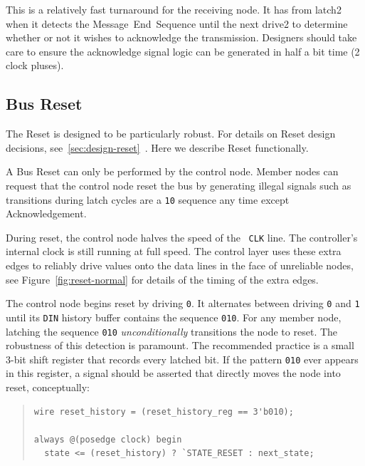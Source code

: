 This is a relatively fast turnaround for the receiving node. It has from {\sc
latch2} when it detects the Message~End~Sequence until the next {\sc drive2} to
determine whether or not it wishes to acknowledge the transmission. Designers
should take care to ensure the acknowledge signal logic can be generated in
half a bit time (2 clock pluses).


\subsection{Bus Reset}
\label{sec:protocol-reset}
The \bus Reset is designed to be particularly robust. For details on Reset
design decisions, see~\ref{sec:design-reset}~. Here
we describe Reset functionally.

A Bus Reset can only be performed by the control node. Member nodes can
request that the control node reset the bus by generating illegal signals such
as transitions during {\sc latch} cycles are a {\tt 10} sequence any time
except Acknowledgement.

During reset, the control node halves the speed of the \bus~{\tt CLK} line.
The controller's internal clock is still running at full speed. The control
layer uses these extra edges to reliably drive values onto the data lines in
the face of unreliable nodes, see Figure~\ref{fig:reset-normal} for details of
the timing of the extra edges.

The control node begins reset by driving {\tt 0}. It alternates between
driving {\tt 0} and {\tt 1} until its {\tt DIN} history buffer contains the
sequence {\tt 010}. For any member node, latching the sequence {\tt 010} {\em
unconditionally} transitions the node to {\sc reset}. The robustness of this
detection is paramount. The recommended practice is a small 3-bit shift
register that records every latched bit. If the pattern {\tt 010} ever appears
in this register, a signal should be asserted that directly moves the node
into {\sc reset}, conceptually:

\begin{quote}
\begin{lstlisting}
wire reset_history = (reset_history_reg == 3'b010);

always @(posedge clock) begin
  state <= (reset_history) ? `STATE_RESET : next_state;
\end{lstlisting}
\end{quote}


